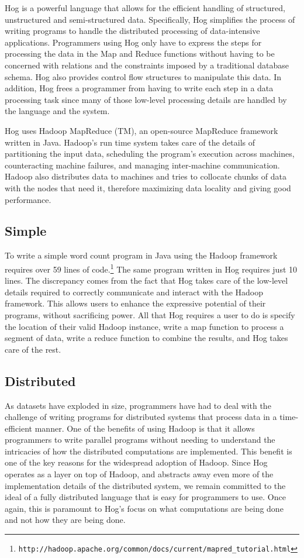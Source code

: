 \documentclass{report}
\begin{document}
Hog is a powerful language that allows for the efficient handling of
structured, unstructured and semi-structured data. Specifically, Hog simplifies
the process of writing programs to handle the distributed processing of
data-intensive applications. Programmers using Hog only have to express the
steps for processing the data in the Map and Reduce functions without having to
be concerned with relations and the constraints imposed by a traditional
database schema. Hog also provides control flow structures to manipulate this
data. In addition, Hog frees a programmer from having to write each step in a
data processing task since many of those low-level processing details are
handled by the language and the system.

Hog uses Hadoop MapReduce (TM), an open-source MapReduce framework written in
Java. Hadoop’s run time system takes care of the details of partitioning the
input data, scheduling the program’s execution across machines, counteracting
machine failures, and managing inter-machine communication. Hadoop also
distributes data to machines and tries to collocate chunks of data with the
nodes that need it, therefore maximizing data locality and giving good
performance.


\subsection{Simple}
\label{sub:simple}

To write a simple word count program in Java using the Hadoop framework
requires over 59 lines of
code.\footnote{\texttt{http://hadoop.apache.org/common/docs/current/mapred\_tutorial.html}}
The same program written in Hog requires just 10 lines. The discrepancy comes
from the fact that Hog takes care of the low-level details required to
correctly communicate and interact with the Hadoop framework. This allows users
to enhance the expressive potential of their programs, without sacrificing
power. All that Hog requires a user to do is specify the location of their
valid Hadoop instance, write a map function to process a segment of data, write
a reduce function to combine the results, and Hog takes care of the rest.


\subsection{Distributed}
\label{sub:distributed}

As datasets have exploded in size, programmers have had to deal with the
challenge of writing programs for distributed systems that process data in a
time-efficient manner. One of the benefits of using Hadoop is that it allows
programmers to write parallel programs without needing to understand the
intricacies of how the distributed computations are implemented. This benefit
is one of the key reasons for the widespread adoption of Hadoop. Since Hog
operates as a layer on top of Hadoop, and abstracts away even more of the
implementation details of the distributed system, we remain committed to the
ideal of a fully distributed language that is easy for programmers to use. Once
again, this is paramount to Hog’s focus on what computations are being done and
not how they are being done.
\end{document}
